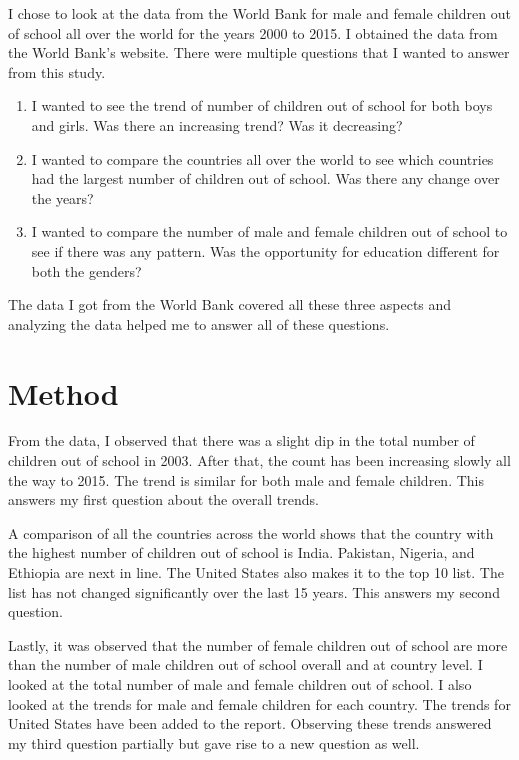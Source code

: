 \documentclass{article}
\begin{document}
I chose to look at the data from the World Bank for male and female children out of school all over the world for the years 2000 to 2015. I obtained the data from the World Bank’s website.
There were multiple questions that I wanted to answer from this study.
\begin{enumerate}
\item I wanted to see the trend of number of children out of school for both boys and girls. Was there an increasing trend? Was it decreasing?
\item I wanted to compare the countries all over the world to see which countries had the largest number of children out of school. Was there any change over the years?
\item I wanted to compare the number of male and female children out of school to see if there was any pattern. Was the opportunity for education different for both the genders?
\end{enumerate}


The data I got from the World Bank covered all these three aspects and analyzing the data helped me to answer all of these questions.

\section{Method}

From the data, I observed that there was a slight dip in the total number of children out of school in 2003. After that, the count has been increasing slowly all the way to 2015. The trend is similar for both male and female children. This answers my first question about the overall trends.

A comparison of all the countries across the world shows that the country with the highest number of children out of school is India. Pakistan, Nigeria, and Ethiopia are next in line. The United States also makes it to the top 10 list. The list has not changed significantly over the last 15 years. This answers my second question.

Lastly, it was observed that the number of female children out of school are more than the number of male children out of school overall and at country level. I looked at the total number of male and female children out of school. I also looked at the trends for male and female children for each country. The trends for United States have been added to the report. Observing these trends answered my third question partially but gave rise to a new question as well.
\end{document}
